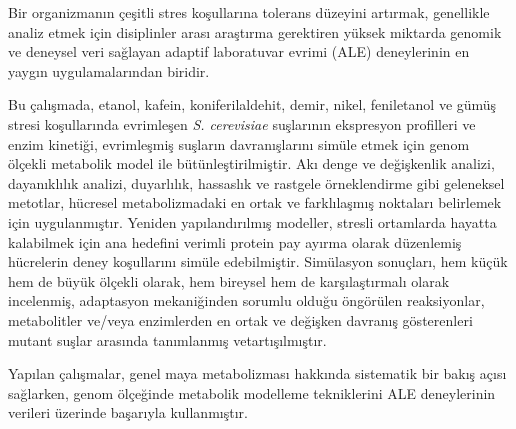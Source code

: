 Bir organizmanın çeşitli stres koşullarına tolerans düzeyini artırmak, genellikle analiz etmek için disiplinler arası araştırma gerektiren yüksek miktarda genomik ve deneysel veri sağlayan adaptif laboratuvar evrimi (ALE) deneylerinin en yaygın uygulamalarından biridir.

Bu çalışmada, etanol, kafein, koniferilaldehit, demir, nikel, feniletanol ve gümüş stresi koşullarında evrimleşen \emph{S. cerevisiae} suşlarının ekspresyon profilleri ve enzim kinetiği, evrimleşmiş suşların davranışlarını simüle etmek için genom ölçekli metabolik model ile bütünleştirilmiştir. Akı denge ve değişkenlik analizi, dayanıklılık analizi, duyarlılık, hassaslık ve rastgele örneklendirme gibi geleneksel metotlar, hücresel metabolizmadaki en ortak ve farklılaşmış noktaları belirlemek için uygulanmıştır. Yeniden yapılandırılmış modeller, stresli ortamlarda hayatta kalabilmek için ana hedefini verimli protein pay ayırma olarak düzenlemiş hücrelerin deney koşullarını simüle edebilmiştir. Simülasyon sonuçları, hem küçük hem de büyük ölçekli olarak, hem bireysel hem de karşılaştırmalı olarak incelenmiş, adaptasyon mekaniğinden sorumlu olduğu öngörülen reaksiyonlar, metabolitler ve/veya enzimlerden en ortak ve değişken davranış gösterenleri mutant suşlar arasında tanımlanmış vetartışılmıştır.

Yapılan çalışmalar, genel maya metabolizması hakkında sistematik bir bakış açısı sağlarken, genom ölçeğinde metabolik modelleme tekniklerini ALE deneylerinin verileri üzerinde başarıyla kullanmıştır.
